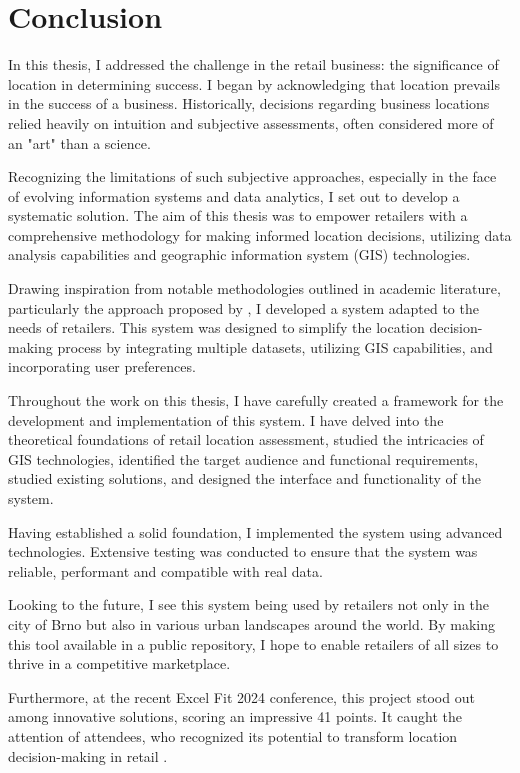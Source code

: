 \chapter{Conclusion}

In this thesis, I addressed the challenge in the retail business: the significance of location in determining success. I began by acknowledging that location prevails in the success of a business. Historically, decisions regarding business locations relied heavily on intuition and subjective assessments, often considered more of an "art" than a science.

Recognizing the limitations of such subjective approaches, especially in the face of evolving information systems and data analytics, I set out to develop a systematic solution. The aim of this thesis was to empower retailers with a comprehensive methodology for making informed location decisions, utilizing data analysis capabilities and geographic information system (GIS) technologies.

Drawing inspiration from notable methodologies outlined in academic literature, particularly the approach proposed by \cite{roig2013retail}, I developed a system adapted to the needs of retailers. This system was designed to simplify the location decision-making process by integrating multiple datasets, utilizing GIS capabilities, and incorporating user preferences.

Throughout the work on this thesis, I have carefully created a framework for the development and implementation of this system. I have delved into the theoretical foundations of retail location assessment, studied the intricacies of GIS technologies, identified the target audience and functional requirements, studied existing solutions, and designed the interface and functionality of the system.

Having established a solid foundation, I implemented the system using advanced technologies. Extensive testing was conducted to ensure that the system was reliable, performant and compatible with real data.

Looking to the future, I see this system being used by retailers not only in the city of Brno but also in various urban landscapes around the world. By making this tool available in a public repository, I hope to enable retailers of all sizes to thrive in a competitive marketplace.

Furthermore, at the recent Excel Fit 2024 conference, this project stood out among innovative solutions, scoring an impressive 41 points. It caught the attention of attendees, who recognized its potential to transform location decision-making in retail \cite{excel2024fit}.